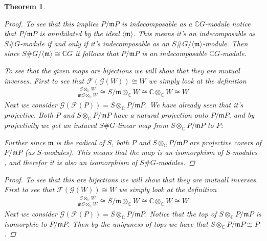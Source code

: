\documentclass[11pt, a4paper, english]{article}
\numberwithin{prop}{section}
\numberwithin{lemma}{section}
\newtheorem{theorem}{Theorem}
\numberwithin{theorem}{section}
\numberwithin{defin}{section}
\numberwithin{example}{section}
\newcommand{\C}{\mathbb{C}}
\begin{document}
\begin{theorem}
\begin{proof}
To see that this implies $P/\mathfrak{m}P$ is indecomposable as a $\C G$-module notice that $P/\mathfrak{m}P$ is annihilated by the ideal $\langle \mathfrak{m} \rangle$. This means it's an indecomposable as $S\#G$-module if and only if it's indecomposable as an $S\#G/\langle \mathfrak{m} \rangle$-module. Then since $S\#G/\langle \mathfrak{m} \rangle \cong \C G$ it follows that $P/\mathfrak{m}P$ is an indecomposable $\C G$-module.

To see that the given maps are bijections we will show that they are mutual inverses. First to see that $\mathcal{F}(\mathcal{G}(W)) \cong W$ we simply look at the definition
\begin{equation*}
\begin{split}
\frac{S \otimes_\C W}{\mathfrak{m}S \otimes_\C W} \cong S/\mathfrak{m} \otimes_\C W \cong \C \otimes_\C W \cong W
\end{split}
\end{equation*}
Next we consider $\mathcal{G}(\mathcal{F}(P)) = S \otimes_\C P/\mathfrak{m}P$. We have already seen that it's projective. Both $P$ and $S \otimes_\C P/\mathfrak{m}P$ have a natural projection onto $P/\mathfrak{m}P$, and by projectivity we get an induced $S\#G$-linear map from $S \otimes_\C P/\mathfrak{m}P$ to $P$:
\begin{center}
\end{center}
Further since $\mathfrak{m}$ is the radical of $S$, both $P$ and $S \otimes_\C P/\mathfrak{m}P$ are projective covers of $P/\mathfrak{m}P$ (as $S$-modules). This means that the map is an isomorphism of $S$-modules {\color{red}{Why is P the projective cover of P/mP, is mP the radical of P? radical is small when P noetherian. mP is in the radical when S or P artinian. Im lost!}}, and therefor it is also an isomorphism of $S\#G$-modules.
\end{proof}

\iffalse
\begin{proof}
To see that this are bijections we will show that they are mutuall inverses. First to see that $\mathcal{F}(\mathcal{G}(W)) \cong W$ we simply look at the definition
\begin{equation*}
\begin{split}
\frac{S \otimes_\C W}{\mathfrak{m}S \otimes_\C W} \cong S/\mathfrak{m} \otimes_\C W \cong \C \otimes_\C W \cong W
\end{split}
\end{equation*}
Next we consider $\mathcal{G}(\mathcal{F}(P)) = S \otimes_\C P/\mathfrak{m}P$. Notice that the top of $ S \otimes_\C P/\mathfrak{m}P$ is isomorphic to $P/\mathfrak{m}P$. Then by the uniquness of tops we have that $ S \otimes_\C P/\mathfrak{m}P \cong P$.


\end{proof}
\end{theorem}
\end{document}
